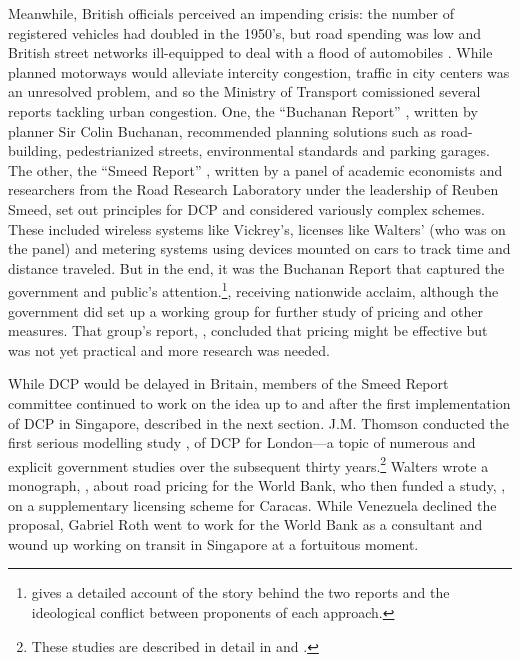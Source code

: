 Meanwhile, British officials perceived an impending crisis: the number of registered vehicles had doubled in the 1950's, but road spending was low and British street networks ill-equipped to deal with a flood of automobiles \citep{Gunn2011,Hall2004}. While planned motorways would alleviate intercity congestion, traffic in city centers was an unresolved problem, and so the Ministry of Transport comissioned several reports tackling urban congestion. One, the ``Buchanan Report'' \citep{MoT1963}, written by planner Sir Colin Buchanan, recommended planning solutions such as road-building, pedestrianized streets, environmental standards and parking garages. The other, the ``Smeed Report'' \citep{MoT1964}, written by a panel of academic economists and researchers from the Road Research Laboratory under the leadership of Reuben Smeed, set out principles for DCP and considered variously complex schemes. These included wireless systems like Vickrey's, licenses like Walters' (who was on the panel) and metering systems using devices mounted on cars to track time and distance traveled. But in the end, it was the Buchanan Report that captured the government and public's attention.\footnote{\citet{Rooney2014} gives a detailed account of the story behind the two reports and the ideological conflict between proponents of each approach.}, receiving nationwide acclaim, although the government did set up a working group for further study of pricing and other measures.  That group's report, \citet{MoT1967}, concluded that pricing might be effective but was not yet practical and more research was needed.

While DCP would be delayed in Britain, members of the Smeed Report committee continued to work on the idea up to and after the first implementation of DCP in Singapore, described in the next section. J.M. Thomson conducted the first serious modelling study \citep{Thomson1967a}, of DCP for London---a topic of numerous and explicit government studies over the subsequent thirty years.\footnote{These studies are described in detail in \citet[Ch. 4]{Richards2006} and \citet[Ch. 4]{Gomez-Ibanez1994}.} Walters wrote a monograph, \citet{Walters1968}, about road pricing for the World Bank, who then funded a study, \citet{Vorhees1973}, on a supplementary licensing scheme for Caracas. While Venezuela declined the proposal, Gabriel Roth went to work for the World Bank as a consultant and wound up working on transit in Singapore at a fortuitous moment.
